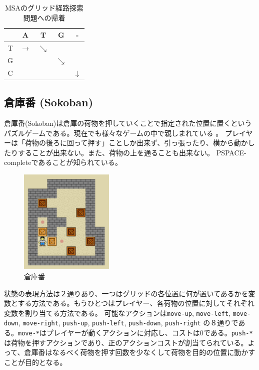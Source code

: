 \begin{table}
  \centering
\caption{MSAのグリッド経路探索問題への帰着}
\begin{tabular}{c|cccc}
  \toprule
	  & A & T & G & - \\ \midrule
	T & $\rightarrow$ & $\searrow$ &   &   \\
	G &   &   & $\searrow$ &   \\
	C &   &   &   & $\downarrow$ \\
        \bottomrule
\end{tabular}
\label{tbl:msa-to-grid}
\end{table}


\subsection{倉庫番 (Sokoban)}
倉庫番(Sokoban)は倉庫の荷物を押していくことで指定された位置に置くというパズルゲームである。現在でも様々なゲームの中で親しまれている \cite{junghanns1997sokoban,culberson:97}。
プレイヤーは「荷物の後ろに回って押す」ことしか出来ず、引っ張ったり、横から動かしたりすることが出来ない。また、荷物の上を通ることも出来ない。
PSPACE-completeであることが知られている\cite{culberson:97}。


\begin{figure}
\centering
\includegraphics[bb=0 0 213 238,width=0.4\textwidth]{figures/sokoban.pdf}
\caption{倉庫番}
\label{fig:sokoban}
\end{figure}

状態の表現方法は２通りあり、一つはグリッドの各位置に何が置いてあるかを変数とする方法である。もうひとつはプレイヤー、各荷物の位置に対してそれぞれ変数を割り当てる方法である。
可能なアクションは{\tt move-up}, {\tt move-left}, {\tt move-down}, {\tt move-right}, {\tt push-up}, {\tt push-left}, {\tt push-down}, {\tt push-right} の８通りである。{\tt move-*}はプレイヤーが動くアクションに対応し、コストは0である。{\tt push-*}は荷物を押すアクションであり、正のアクションコストが割当てられている。よって、倉庫番はなるべく荷物を押す回数を少なくして荷物を目的の位置に動かすことが目的となる。


